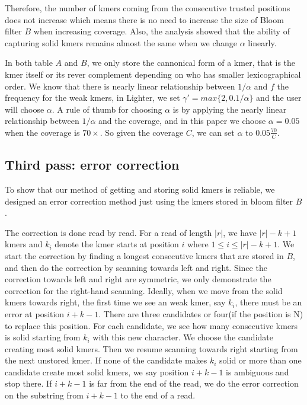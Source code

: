 \documentclass[10pt]{article}
\begin{document}
Therefore, the number of kmers coming from the consecutive trusted positions does not increase which means there is no need to increase the size of Bloom filter $B$ when increasing coverage. Also, the analysis showed that the ability of capturing solid kmers remains almost the same when we change $\alpha$ linearly. 

In both table $A$ and $B$, we only store the cannonical form of a kmer, that is the kmer itself or its rever complement depending on who has smaller lexicographical order. We know that there is nearly linear relationship between $1/\alpha$ and $f$ the frequency for the weak kmers, in Lighter, we set $\gamma'=max\{2,0.1/\alpha\}$ and the user will choose $\alpha$. A rule of thumb for choosing $\alpha$ is by applying the nearly linear relationship between $1/\alpha$ and the coverage, and in this paper we choose $\alpha=0.05$ when the coverage is $70\times$. So given the coverage $C$, we can set $\alpha$ to $0.05\frac{70}{C}$. 

\subsection*{Third pass: error correction}
To show that our method of getting and storing solid kmers is reliable, we designed an error correction method just using the kmers stored in bloom filter $B$.

The correction is done read by read. For a read of length $|r|$, we have $|r|-k+1$ kmers and $k_i$ denote the kmer starts at position $i$ where $1\le i\le|r|-k+1$. We start the correction by finding a longest consecutive kmers that are stored in $B$, and then do the correction by scanning towards left and right. Since the correction towards left and right are symmetric, we only demonstrate the correction for the right-hand scanning. Ideally, when we move from the solid kmers towards right, the first time we see an weak kmer, say $k_i$, there must be an error at position $i+k-1$. There are three candidates or four(if the position is N) to replace this position. For each candidate, we see how many consecutive kmers is solid starting from $k_i$ with this new character. We choose the candidate creating most solid kmers. Then we resume scanning towards right starting from the next unstored kmer. If none of the candidate makes $k_i$ solid or more than one candidate create most solid kmers, we say position $i+k-1$ is ambiguous and stop there. If $i+k-1$ is far from the end of the read, we do the error correction on the substring from $i+k-1$ to the end of a read.
\end{document}
